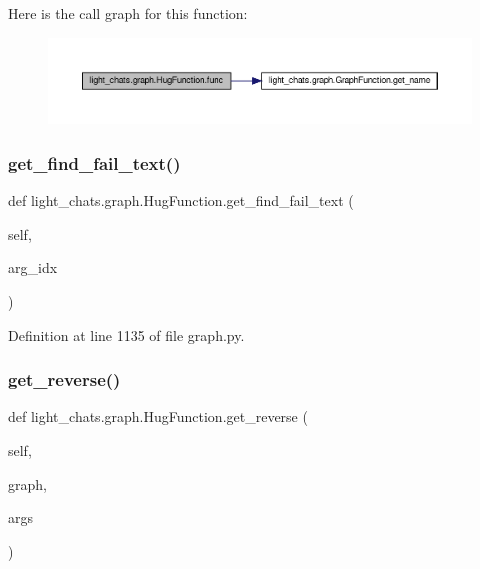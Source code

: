 Here is the call graph for this function\+:
\nopagebreak
\begin{figure}[H]
\begin{center}
\leavevmode
\includegraphics[width=350pt]{classlight__chats_1_1graph_1_1HugFunction_a581fcc58cb0a76a19a02d8c87d911fb9_cgraph}
\end{center}
\end{figure}
\mbox{\label{classlight__chats_1_1graph_1_1HugFunction_a3a8b8178a34dff402172109bcd9c9ebf}} 
\subsubsection{\texorpdfstring{get\+\_\+find\+\_\+fail\+\_\+text()}{get\_find\_fail\_text()}}
{\footnotesize\ttfamily def light\+\_\+chats.\+graph.\+Hug\+Function.\+get\+\_\+find\+\_\+fail\+\_\+text (\begin{DoxyParamCaption}\item[{}]{self,  }\item[{}]{arg\+\_\+idx }\end{DoxyParamCaption})}



Definition at line 1135 of file graph.\+py.

\mbox{\label{classlight__chats_1_1graph_1_1HugFunction_ae028317cf500a21a8787b73ca7964e48}} 
\subsubsection{\texorpdfstring{get\+\_\+reverse()}{get\_reverse()}}
{\footnotesize\ttfamily def light\+\_\+chats.\+graph.\+Hug\+Function.\+get\+\_\+reverse (\begin{DoxyParamCaption}\item[{}]{self,  }\item[{}]{graph,  }\item[{}]{args }\end{DoxyParamCaption})}



